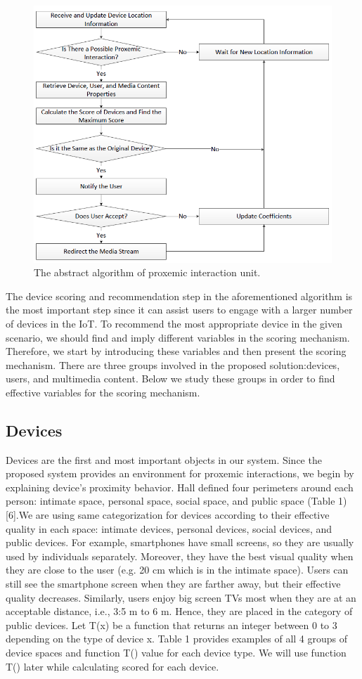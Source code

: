 \documentclass{article}
\begin{document}
\begin{figure}[h!]
    \includegraphics[width=0.8\linewidth,height=0.8\linewidth]{fig.png}
    \caption{The abstract algorithm of proxemic interaction unit.}

\end{figure}

The device scoring and recommendation step in the aforementioned algorithm is the most important step since it can assist users to engage with a larger number of devices in the IoT. To recommend the most appropriate device in the given scenario, we should find and imply different variables in the scoring mechanism. Therefore, we start by introducing these variables and then present the scoring mechanism. There are three groups involved in the proposed solution:devices, users, and multimedia content. Below we study these groups in order to find effective variables for the scoring mechanism.
\subsection{Devices}
Devices are the first and most important objects in our system. Since the proposed system provides an environment for proxemic interactions, we begin by explaining device's proximity behavior. Hall defined four perimeters around each person: intimate space, personal space, social space, and public space (Table 1) [6].We are using same categorization for devices according to their effective quality in each space: intimate devices, personal devices, social devices, and public devices. For example, smartphones have small screens, so they are usually used
by individuals separately. Moreover, they have the best visual quality when they are close to the user (e.g. 20 cm which is in the intimate space). Users can still see the smartphone screen when they are farther away, but their effective quality decreases. Similarly, users enjoy big screen TVs most when they are at an acceptable distance, i.e., 3:5 m to 6 m. Hence, they are placed in the category of public devices. Let T(x) be a function that returns an integer between 0 to 3 depending on the type of device x. Table 1 provides examples of all 4 groups of device spaces and function T() value for each device type. We will use function T() later while calculating scored for each device.
\end{document}
